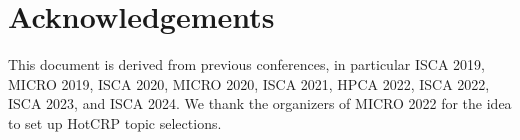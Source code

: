 \section*{Acknowledgements}
\label{sec:acknowledge}
This document is derived from previous conferences, in particular ISCA 2019, MICRO 2019, ISCA 2020, MICRO 2020, ISCA 2021, HPCA 2022, ISCA 2022, ISCA 2023, and ISCA 2024. We thank the organizers of MICRO 2022 for the idea to set up HotCRP topic selections.